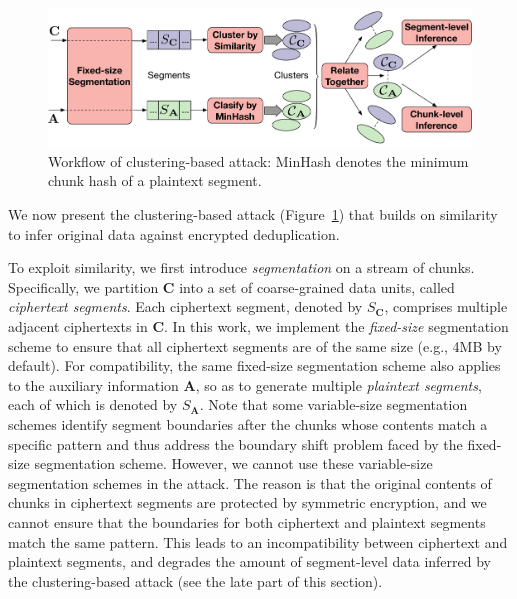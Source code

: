 \begin{figure}
	\includegraphics[width=.48\textwidth]{pic/clustering-attack-new.pdf}
    \caption{Workflow of clustering-based attack: MinHash denotes the minimum chunk hash of a plaintext segment.}
	\label{fig:clustering-attack}
\end{figure}

We now present the clustering-based attack (Figure~\ref{fig:clustering-attack}) that builds on similarity to infer original data against encrypted deduplication. 


To exploit similarity, we first introduce {\em segmentation} on a stream of chunks. Specifically, we partition $\mathbf{C}$ into a set of coarse-grained data units, called {\em ciphertext segments}. Each ciphertext segment, denoted by $S_\mathbf{C}$, comprises multiple adjacent ciphertexts in $\mathbf{C}$. In this work, we implement the {\em fixed-size} segmentation scheme to ensure that all ciphertext segments are of the same size (e.g., 4MB by default). 
For compatibility, the same fixed-size segmentation scheme also applies to the auxiliary information $\mathbf{A}$, so as to generate multiple {\em plaintext segments}, each of which is denoted by $S_\mathbf{A}$. 
Note that some variable-size segmentation schemes \cite{lillibridge09, qin17}  identify segment boundaries after the chunks whose contents match a specific pattern and thus address the boundary shift problem faced by the fixed-size segmentation scheme. 
However, we cannot use these variable-size segmentation schemes \cite{lillibridge09, qin17} in the attack. The reason is that the original contents of chunks in ciphertext segments are protected by symmetric encryption, and we cannot ensure that the boundaries for both ciphertext and plaintext segments match the same pattern. This leads to an incompatibility between ciphertext and plaintext segments, and degrades the amount of segment-level data inferred by the clustering-based attack (see the late part of this section).    

